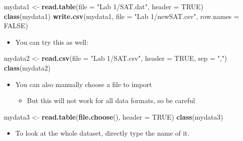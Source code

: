 \documentclass[
]{book}
\newenvironment{Shaded}{\begin{snugshade}}{\end{snugshade}}
\newcommand{\AttributeTok}[1]{\textcolor[rgb]{0.13,0.29,0.53}{#1}}
\newcommand{\ConstantTok}[1]{\textcolor[rgb]{0.56,0.35,0.01}{#1}}
\newcommand{\FunctionTok}[1]{\textcolor[rgb]{0.13,0.29,0.53}{\textbf{#1}}}
\newcommand{\NormalTok}[1]{#1}
\newcommand{\OtherTok}[1]{\textcolor[rgb]{0.56,0.35,0.01}{#1}}
\newcommand{\StringTok}[1]{\textcolor[rgb]{0.31,0.60,0.02}{#1}}
\providecommand{\tightlist}{%
  \setlength{\itemsep}{0pt}\setlength{\parskip}{0pt}}
\begin{document}
\begin{Shaded}
\begin{Highlighting}[]
\NormalTok{mydata1 }\OtherTok{\textless{}{-}} \FunctionTok{read.table}\NormalTok{(}\AttributeTok{file =} \StringTok{"Lab 1/SAT.dat"}\NormalTok{, }\AttributeTok{header =} \ConstantTok{TRUE}\NormalTok{)}
\FunctionTok{class}\NormalTok{(mydata1)}
\FunctionTok{write.csv}\NormalTok{(mydata1, }\AttributeTok{file =} \StringTok{"Lab 1/newSAT.csv"}\NormalTok{, }\AttributeTok{row.names =} \ConstantTok{FALSE}\NormalTok{)}
\end{Highlighting}
\end{Shaded}

\begin{itemize}
\tightlist
\item
  You can try this as well:
\end{itemize}

\begin{Shaded}
\begin{Highlighting}[]
\NormalTok{mydata2 }\OtherTok{\textless{}{-}} \FunctionTok{read.csv}\NormalTok{(}\AttributeTok{file =} \StringTok{"Lab 1/SAT.csv"}\NormalTok{, }\AttributeTok{header =} \ConstantTok{TRUE}\NormalTok{, }\AttributeTok{sep =} \StringTok{","}\NormalTok{)}
\FunctionTok{class}\NormalTok{(mydata2)}
\end{Highlighting}
\end{Shaded}

\begin{itemize}
\tightlist
\item
  You can also manually choose a file to import

  \begin{itemize}
  \tightlist
  \item
    But this will not work for all data formats, so be careful
  \end{itemize}
\end{itemize}

\begin{Shaded}
\begin{Highlighting}[]
\NormalTok{mydata3 }\OtherTok{\textless{}{-}} \FunctionTok{read.table}\NormalTok{(}\FunctionTok{file.choose}\NormalTok{(), }\AttributeTok{header =} \ConstantTok{TRUE}\NormalTok{)}
\FunctionTok{class}\NormalTok{(mydata3)}
\end{Highlighting}
\end{Shaded}

\begin{itemize}
\tightlist
\item
  To look at the whole dataset, directly type the name of it.
\end{itemize}
\end{document}
